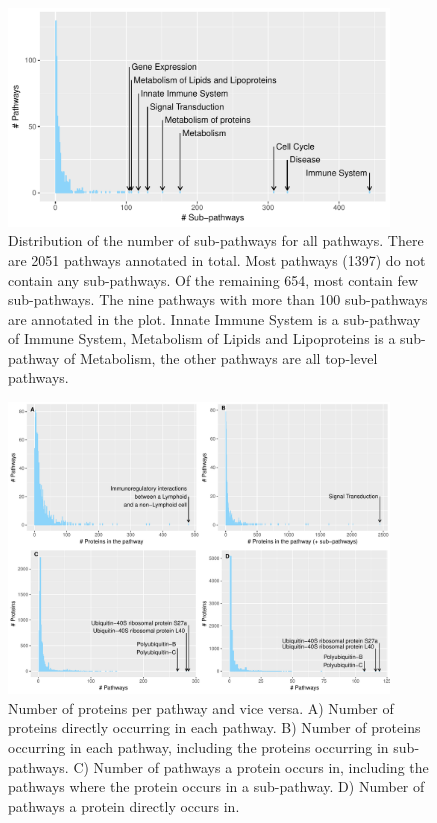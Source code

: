 \documentclass[10pt,twoside]{article}
\begin{document}
\begin{figure}
  \centering
  \includegraphics[width=0.9\textwidth]{../S2/FigureS2.pdf}
  \caption[Distribution of the number of sub-pathways for all
    pathways]{Distribution of the number of sub-pathways for all
    pathways. There are 2051 pathways annotated in total. Most
    pathways (1397) do not contain any sub-pathways. Of the remaining
    654, most contain few sub-pathways. The nine pathways with more
    than 100 sub-pathways are annotated in the plot. Innate Immune
    System is a sub-pathway of Immune System, Metabolism of Lipids and
    Lipoproteins is a sub-pathway of Metabolism, the other pathways
    are all top-level pathways.}
  \label{fig:s2}
\end{figure}

\begin{figure}
  \centering
  \includegraphics[width=0.9\textwidth]{../S3/FigureS3.pdf}
  \caption[Number of proteins per pathway and vice versa]{Number of proteins per pathway and vice versa. A) Number of
    proteins directly occurring in each pathway. B) Number of proteins
    occurring in each pathway, including the proteins occurring in
    sub-pathways. C) Number of pathways a protein occurs in, including
    the pathways where the protein occurs in a sub-pathway. D) Number
    of pathways a protein directly occurs in.}
  \label{fig:s3}
\end{figure}
\end{document}
